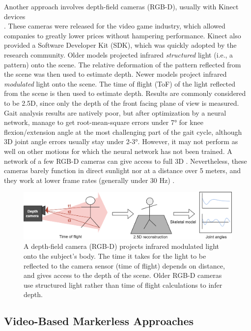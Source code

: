 Another approach involves depth-field cameras (RGB-D), usually with Kinect devices \\\cite{Kinect}. These cameras were released for the video game industry, which allowed companies to greatly lower prices without hampering performance. Kinect also provided a Software Developer Kit (SDK), which was quickly adopted by the research community. Older models projected infrared \textit{structured} light (i.e., a pattern) onto the scene. The relative deformation of the pattern reflected from the scene was then used to estimate depth. Newer models project infrared \textit{modulated} light onto the scene. The time of flight (ToF) of the light reflected from the scene is then used to estimate depth. Results are commonly considered to be 2.5D, since only the depth of the front facing plane of view is measured. Gait analysis results are natively poor, but after optimization by a neural network, \cite{Guo2022} manage to get root-mean-square errors under 7° for knee flexion/extension angle at the most challenging part of the gait cycle, although 3D joint angle errors usually stay under 2-3°. However, it may not perform as well on other motions for which the neural network has not been trained. A network of a few RGB-D cameras can give access to full 3D \cite{Carraro2017,Choppin2013,Colombel2020}. Nevertheless, these cameras barely function in direct sunlight nor at a distance over 5 meters, and they work at lower frame rates (generally under 30 Hz) \cite{Han2013, Pagliari2015}. 

\begin{figure}[hbtp]
	\centering
	\def\svgwidth{1\columnwidth}
	\fontsize{10pt}{10pt}\selectfont
	\includegraphics[width=\linewidth]{"../Chap1/Figures/Fig_Depth.png"}
	\caption{A depth-field camera (RGB-D) projects infrared modulated light onto the subject's body. The time it takes for the light to be reflected to the camera sensor (time of flight) depends on distance, and gives access to the depth of the scene.	Older RGB-D cameras use structured light rather than time of flight calculations to infer depth.}
	\label{fig_depth}
\end{figure}

\FloatBarrier
\subsection{Video-Based Markerless Approaches}

